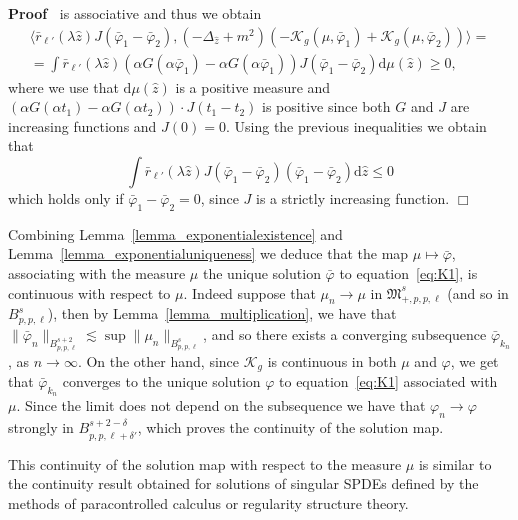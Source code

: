 \documentclass[a4paper,10pt]{article}
\newcommand{\mathd}{\mathrm{d}}
\newenvironment{proof}{\noindent\textbf{Proof\ }}{\hspace*{\fill}$\Box$\medskip}
\begin{document}
\begin{proof}
  is associative and thus we obtain
  \begin{eqnarray}
    & \langle \bar{r}_{\ell'} (\lambda \hat{z}) J (\bar{\varphi}_1 -
    \bar{\varphi}_2), (- \Delta_{\hat{z}} + m^2) (- \mathcal{K}_g (\mu,
    \bar{\varphi}_1) + \mathcal{K}_g (\mu, \bar{\varphi}_2)) \rangle = & 
    \nonumber\\
    & = \int \bar{r}_{\ell'} (\lambda \hat{z}) (\alpha G (\alpha
    \bar{\varphi}_1) - \alpha G (\alpha \bar{\varphi}_1)) J (\bar{\varphi}_1 -
    \bar{\varphi}_2) \mathd \mu (\hat{z}) \geqslant 0, &  \nonumber
  \end{eqnarray}
  where we use that $\mathd \mu (\hat{z})$ is a positive measure and $(\alpha
  G (\alpha t_1) - \alpha G (\alpha t_2)) \cdot J (t_1 - t_2)$ is positive
  since both $G$ and $J$ are increasing functions and $J (0) = 0$. Using the
  previous inequalities we obtain that
  \[ \int \bar{r}_{\ell'} (\lambda \hat{z}) J (\bar{\varphi}_1 -
     \bar{\varphi}_2) (\bar{\varphi}_1 - \bar{\varphi}_2) \mathd \hat{z}
     \leqslant 0 \]
  which holds only if $\bar{\varphi}_1 - \bar{\varphi}_2 = 0$, since $J$ is a
  strictly increasing function. 
\end{proof}

\begin{remark}
  Combining Lemma~\ref{lemma_exponentialexistence} and
  Lemma~\ref{lemma_exponentialuniqueness} we deduce that the map $\mu
  \longmapsto \bar{\varphi}$, associating with the measure $\mu$ the unique
  solution $\bar{\varphi}$ to equation~{\eqref{eq:K1}}, is continuous with
  respect to $\mu$. Indeed suppose that $\mu_n \rightarrow \mu$ in
  $\mathfrak{M}^s_{+, p, p, \ell}$ (and so in $B^s_{p, p, \ell}$), then by
  Lemma~\ref{lemma_multiplication}, we have that $\| \bar{\varphi}_n \|_{B^{s
  + 2}_{p, p, \ell}} \lesssim \sup \| \mu_n \|_{B^s_{p, p, \ell}}$, and so
  there exists a converging subsequence $\bar{\varphi}_{k_n}$, as $n
  \rightarrow \infty$. On the other hand, since $\mathcal{K}_g$ is continuous
  in both $\mu$ and $\varphi$, we get that $\bar{\varphi}_{k_n}$ converges to
  the unique solution $\varphi$ to equation~{\eqref{eq:K1}} associated with
  $\mu .$ Since the limit does not depend on the subsequence we have that
  $\varphi_n \rightarrow \varphi$ strongly in $B^{s + 2 - \delta}_{p, p, \ell
  + \delta'}$, which proves the continuity of the solution map.
  
  This continuity of the solution map with respect to the measure $\mu$ is
  similar to the continuity result obtained for solutions of singular SPDEs
  defined by the methods of paracontrolled calculus or regularity structure
  theory. 
\end{remark}
\end{document}
